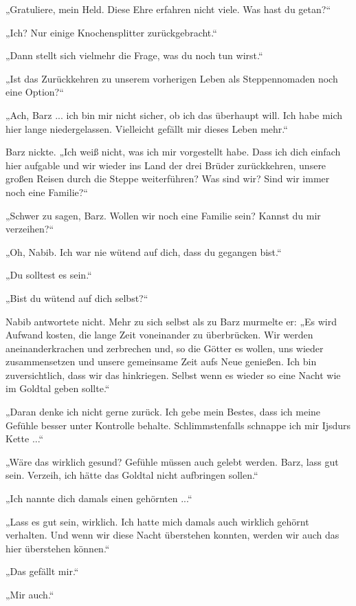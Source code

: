 „Gratuliere, mein Held. Diese Ehre erfahren nicht viele. Was hast du getan?“

„Ich? Nur einige Knochensplitter zurückgebracht.“

„Dann stellt sich vielmehr die Frage, was du noch tun wirst.“

„Ist das Zurückkehren zu unserem vorherigen Leben als Steppennomaden noch eine Option?“

„Ach, Barz ... ich bin mir nicht sicher, ob ich das überhaupt will. Ich habe mich hier lange niedergelassen. Vielleicht gefällt mir dieses Leben mehr.“

Barz nickte. „Ich weiß nicht, was ich mir vorgestellt habe. Dass ich dich einfach hier aufgable und wir wieder ins Land der drei Brüder zurückkehren, unsere großen Reisen durch die Steppe weiterführen? Was sind wir? Sind wir immer noch eine Familie?“

„Schwer zu sagen, Barz. Wollen wir noch eine Familie sein? Kannst du mir verzeihen?“

„Oh, Nabib. Ich war nie wütend auf dich, dass du gegangen bist.“

„Du solltest es sein.“

„Bist du wütend auf dich selbst?“

Nabib antwortete nicht. Mehr zu sich selbst als zu Barz murmelte er: „Es wird Aufwand kosten, die lange Zeit voneinander zu überbrücken. Wir werden aneinanderkrachen und zerbrechen und, so die Götter es wollen, uns wieder zusammensetzen und unsere gemeinsame Zeit aufs Neue genießen. Ich bin zuversichtlich, dass wir das hinkriegen. Selbst wenn es wieder so eine Nacht wie im Goldtal geben sollte.“

„Daran denke ich nicht gerne zurück. Ich gebe mein Bestes, dass ich meine Gefühle besser unter Kontrolle behalte. Schlimmstenfalls schnappe ich mir Ijsdurs Kette ...“

„Wäre das wirklich gesund? Gefühle müssen auch gelebt werden. Barz, lass gut sein. Verzeih, ich hätte das Goldtal nicht aufbringen sollen.“

„Ich nannte dich damals einen gehörnten ...“

„Lass es gut sein, wirklich. Ich hatte mich damals auch wirklich gehörnt verhalten. Und wenn wir diese Nacht überstehen konnten, werden wir auch das hier überstehen können.“

„Das gefällt mir.“

„Mir auch.“\bigskip







